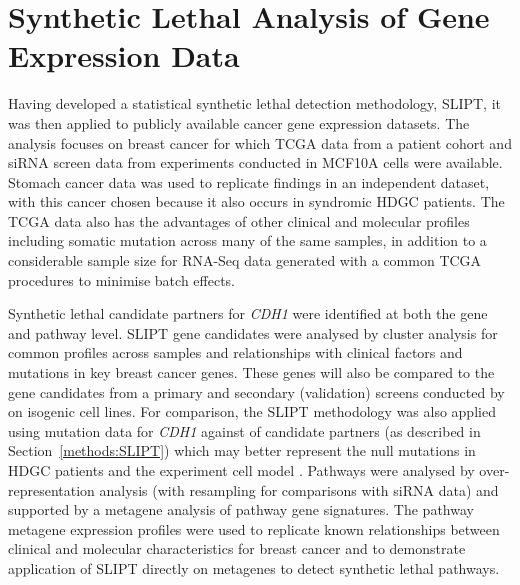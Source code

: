 \chapter{Synthetic Lethal Analysis of Gene Expression Data}
\label{chap:SLIPT}

Having developed a statistical \gls{synthetic lethal} detection methodology, \gls{SLIPT}, it was then applied to publicly available cancer \gls{gene expression} datasets. The analysis focuses on breast cancer for which  \gls{TCGA}  data \citep{TCGA2012} from a patient cohort and \gls{siRNA} screen data \citep{Telford2015} from experiments conducted in \gls{MCF10A} cells were available. Stomach cancer data \citep{TCGA2014GC} was used to replicate findings in an independent dataset, with this cancer chosen because it also occurs in syndromic \gls{HDGC} patients. The \gls{TCGA} data also has the advantages of other clinical and molecular profiles including \gls{somatic} \gls{mutation} across many of the same samples, in addition to a considerable sample size for \gls{RNA-Seq}  data generated with a common \gls{TCGA} procedures to minimise batch effects. %

Synthetic lethal candidate partners for \textit{CDH1} were identified at both the gene and pathway level. \gls{SLIPT} gene candidates were analysed by cluster analysis for common  profiles across samples and relationships with clinical factors and \glspl{mutation} in key breast cancer genes. These genes will also be compared to the gene candidates from a primary and secondary (validation) screens conducted by \citet{Telford2015} on isogenic cell lines. For comparison, the \gls{SLIPT} methodology was also applied using \gls{mutation} data for \textit{CDH1} against  of candidate partners (as described in Section~\ref{methods:SLIPT}) which may better represent the null \glspl{mutation} in \gls{HDGC} patients and the experiment cell model \citep{Chen2014}. Pathways were analysed by over-representation analysis (with resampling for comparisons with \gls{siRNA} data) and supported by a \gls{metagene} analysis of pathway gene signatures. The pathway meta\gls{gene expression} profiles were used to replicate known relationships between clinical and molecular characteristics for breast cancer and to demonstrate application of \gls{SLIPT} directly on \glspl{metagene} to detect \gls{synthetic lethal} pathways.

